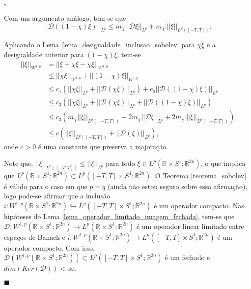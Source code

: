 \documentclass[12pt]{book}
\newenvironment{prova}[1]{$\square$ #1}{\hfill$\blacksquare$}
\newcommand{\circulo}{S^{1}}
\newcommand{\diferencialfloerabrev}{\mathcal{D}}
\newcommand{\espacoLpcontradominio}[2]{L^{p}(#1;#2)}
\newcommand{\espacosobolevcontradominio}[2]{W^{1,p}(#1;#2)}
\newcommand{\intervalofechado}[1]{[-#1,#1]}
\newcommand{\normaLp}[1]{||#1||_{L^{p}}}
\newcommand{\normaLpDominio}[2]{||#1||_{L^{p}(#2)}}
\newcommand{\normaWp}[1]{||#1||_{W^{1,p}}}
\newcommand{\retacartesianocirculo}{\real{} \times \circulo}
\newcommand{\real}[1]{\mathbb{R}^{#1}}
\newcommand{\vermelho}[1]{{\color{red}#1}}
\begin{document}
\begin{prova}
\begin{enumerate}
			Com um argumento análogo, tem-se que
			$$
			\normaLp{\diferencialfloerabrev((1-\chi)\xi)} \leq m_{\chi}\normaLp{\diferencialfloerabrev\xi } +	m_{\chi'}\normaLpDominio{\xi}{\intervalofechado{T}}.
			$$	
			
			Aplicando o Lema \ref{lema_desigualdade_inclusao_sobolev} para $\chi\xi$ e a desigualdade anterior para $(1-\chi)\xi$, tem-se
			$$
			\begin{aligned}
			\normaWp{\xi} 
			&= \normaWp{\xi + \chi\xi - \chi\xi}
			\\
			&\leq  \normaWp{\chi\xi }+ \normaWp{(1-\chi)\xi}
			\\
			&\leq c_{1}( \normaLp{\chi\xi}+\normaLp{\diferencialfloerabrev (\chi\xi)}) + c_{2}\normaLp{\diferencialfloerabrev((1-\chi)\xi)}
			\\
			&\leq c_{3}( \normaLp{\chi\xi}+\normaLp{\diferencialfloerabrev (\chi\xi)} + \normaLp{\diferencialfloerabrev((1-\chi)\xi)})
			\\
			&\leq c_{3}(m_{\chi}\normaLpDominio{\xi}{\intervalofechado{T}}+2m_{\chi}\normaLp{\diferencialfloerabrev \xi} + 2m_{\chi'}\normaLpDominio{\xi}{\intervalofechado{T}})  
			\\
			&\leq c(\normaLpDominio{\xi}{\intervalofechado{T}}+\normaLp{\diferencialfloerabrev (\xi)}),
			\end{aligned}
			$$
			onde $c>0$ é uma constante que preserva a majoração.
			
			Note que, $\normaLpDominio{\xi}{\intervalofechado{T}}\leq \normaLp{\xi}$ para todo $\xi \in \espacoLpcontradominio{\retacartesianocirculo}{\real{2n}}$, o que implica que $\espacoLpcontradominio{\retacartesianocirculo}{\real{2n}} \subset \espacoLpcontradominio{\intervalofechado{T}\times \circulo}{\real{2n}}$. O Teorema \ref{teorema_sobolev} é válido para o caso em que $p=q$ \vermelho{(ainda não estou seguro sobre essa afirmação)}, logo pode-se afirmar que a inclusão $i: \espacosobolevcontradominio{\retacartesianocirculo}{\real{2n}} \hookrightarrow  \espacoLpcontradominio{\intervalofechado{T}\times \circulo}{\real{2n}}$ é um operador compacto. Nas hipóteses do Lema \ref{lema_operador_limitado_imagem_fechada}, tem-se que $\diferencialfloerabrev: \espacosobolevcontradominio{\retacartesianocirculo}{\real{2n}} \to \espacoLpcontradominio{\retacartesianocirculo}{\real{2n}}$ é um operador linear limitado entre espaços de Banach e $i: \espacosobolevcontradominio{\retacartesianocirculo}{\real{2n}} \to \espacoLpcontradominio{\intervalofechado{T}\times \circulo}{\real{2n}}$ é um operador compacto. Com isso, $\diferencialfloerabrev(\espacosobolevcontradominio{\retacartesianocirculo}{\real{2n}}) \subset \espacoLpcontradominio{\intervalofechado{T}\times \circulo}{\real{2n}}$ é um fechado e $dim(Ker(\diferencialfloerabrev)) < \infty$.
			

\end{enumerate}
\end{prova}
\end{document}
